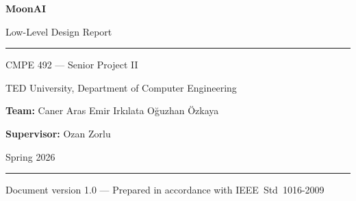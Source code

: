 \documentclass[12pt,a4paper]{article}
\begin{document}
\begin{titlepage}
  \centering
  \vspace*{2cm}
  {\Huge\bfseries MoonAI\par}
  \vspace{0.4cm}
  {\Large Low-Level Design Report\par}
  \vspace{0.8cm}
  \rule{\textwidth}{1pt}
  \vspace{0.4cm}
  {\large CMPE 492 — Senior Project II\par}
  {\large TED University, Department of Computer Engineering\par}
  \vspace{1.2cm}
  {\large
    \textbf{Team:} Caner Aras \quad Emir Irkılata \quad Oğuzhan Özkaya\par
    \vspace{0.3cm}
    \textbf{Supervisor:} Ozan Zorlu\par
  }
  \vspace{1.2cm}
  {\large Spring 2026\par}
  \vfill
  \rule{\textwidth}{0.4pt}
  \vspace{0.3cm}
  {\small Document version 1.0 — Prepared in accordance with IEEE~Std~1016-2009}
\end{titlepage}

\tableofcontents
\newpage











\end{document}
